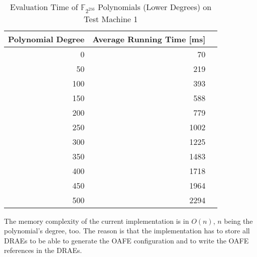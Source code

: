 \begin{table}[ht]
  \centering
  \begin{tabular}{rrr}
    \toprule
    Polynomial Degree & Average Running Time [ms] \\
    \midrule
    0 &   70 \\
    50 &  219 \\
    100 &  393 \\
    150 &  588 \\
    200 &  779 \\
    250 & 1002 \\
    300 & 1225 \\
    350 & 1483 \\
    400 & 1718 \\
    450 & 1964 \\
    500 & 2294 \\
    \bottomrule
  \end{tabular}
  \caption{Evaluation Time of $\mathbb{F}_{2^{256}}$ Polynomials
  (Lower Degrees) on Test Machine 1}
  \label{tab:poly-deg-t-small}
\end{table}


%
%
\label{sec:mem-complexity}

The memory complexity of the current implementation is in $O(n)$, $n$ being the
polynomial's degree, too. The reason is that the implementation has to store all
DRAEs to be able to generate the OAFE configuration and to write the OAFE
references in the DRAEs.

